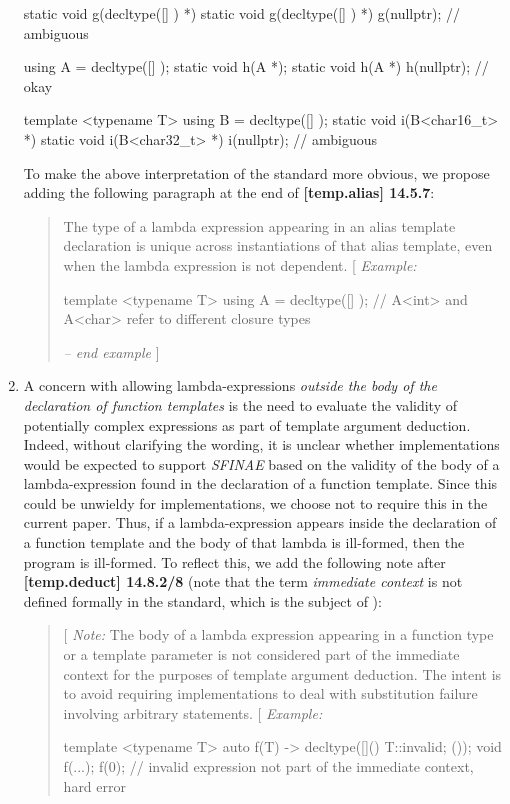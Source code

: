 \documentclass[11pt]{article}
\begin{document}
\begin{enumerate}
\begin{cpp}
static void g(decltype([] { }) *) { }
static void g(decltype([] { }) *) { }
g(nullptr); // ambiguous

using A = decltype([] { });
static void h(A *);
static void h(A *) { }
h(nullptr); // okay

template <typename T>
using B = decltype([] { });
static void i(B<char16_t> *) { }
static void i(B<char32_t> *) { }
i(nullptr); // ambiguous
\end{cpp}

  To make the above interpretation of the standard more obvious, we propose
  adding the following paragraph at the end of \textbf{[temp.alias] 14.5.7}:
  \begin{quote}
    The type of a lambda expression appearing in an alias template declaration
    is unique across instantiations of that alias template, even when the
    lambda expression is not dependent.
    [ \textit{Example:}
\begin{cpp}
template <typename T>
using A = decltype([] {});
// A<int> and A<char> refer to different closure types
\end{cpp}
    \textit{-- end example} ]
  \end{quote}


  \item A concern with allowing lambda-expressions \textit{outside the body of
  the declaration of function templates} is the need to evaluate the validity
  of potentially complex expressions as part of template argument deduction.
  Indeed, without clarifying the wording, it is unclear whether implementations
  would be expected to support \textit{SFINAE} based on the validity of
  the body of a lambda-expression found in the declaration of a function
  template. Since this could be unwieldy for implementations, we choose not
  to require this in the current paper. Thus, if a lambda-expression appears
  inside the declaration of a function template and the body of that lambda
  is ill-formed, then the program is ill-formed. To reflect this, we add the
  following note after \textbf{[temp.deduct] 14.8.2/8} (note that the term
  \textit{immediate context} is not defined formally in the standard, which
  is the subject of \cite{CWG1844}):

  \begin{quote}
    [ \textit{Note:} The body of a lambda expression appearing in a function
    type or a template parameter is not considered part of the immediate
    context for the purposes of template argument deduction. The intent is
    to avoid requiring implementations to deal with substitution failure
    involving arbitrary statements. [ \textit{Example:}
\begin{cpp}
template <typename T>
auto f(T) -> decltype([]() { T::invalid; } ());
void f(...);
f(0); // invalid expression not part of the immediate context, hard error


\end{cpp}
\end{quote}
\end{enumerate}
\end{document}
